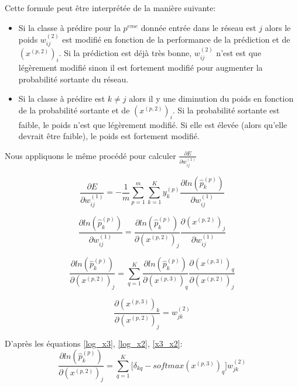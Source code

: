 \documentclass[a4paper,11pt,oneside,roman]{article}
\begin{document}
    Cette formule peut être interprétée de la manière suivante:
    \begin{itemize}
        \item Si la classe à prédire pour la $p^{eme}$ donnée entrée dans le réseau est $j$ alors le poids $w_{ij}^{(2)}$ est modifié en fonction de la performance de la prédiction et de $(x^{(p,2)})_{i}$.
        Si la prédiction est déjà très bonne, $w_{ij}^{(2)}$ n'est est que légèrement modifié sinon il est fortement modifié pour augmenter la probabilité sortante du réseau.
        \item Si la classe à prédire est $k \ne j$ alors il y une diminution du poids en fonction de la probabilité sortante et de $(x^{(p,2)})_{i}$. Si la probabilité sortante est faible, le poids n'est que légèrement modifié. Si elle est élevée (alors qu'elle devrait être faible), le poids est fortement modifié.
    \end{itemize}

    Nous appliquons le même procédé pour calculer $\frac{\partial E}{\partial w_{ij}^{(1)}}$

    \begin{equation}
        \frac{\partial E}{\partial w_{ij}^{(1)}} = -\frac{1}{m} \sum\limits_{p=1}^{m} \sum\limits_{k=1}^{K} y_k^{(p)} \frac{\partial ln(\hat{p}_{k}^{(p)})}{\partial w_{ij}^{(1)}}
        \label{E_wij1}
    \end{equation}

    \begin{equation}
        \frac{\partial ln(\hat{p}_{k}^{(p)})}{\partial w_{ij}^{(1)}} = \frac{\partial ln(\hat{p}_{k}^{(p)})}{\partial (x^{(p,2)})_j} \frac{\partial (x^{(p,2)})_j}{\partial w_{ij}^{(1)}}
        \label{log_wij}
    \end{equation}

    \begin{equation}
        \frac{\partial ln(\hat{p}_{k}^{(p)})}{\partial (x^{(p,2)})_j} = \sum\limits_{q=1}^{K} \frac{\partial ln(\hat{p}_{k}^{(p)})}{\partial (x^{(p,3)})_q} \frac{\partial (x^{(p,3)})_q}{\partial (x^{(p,2)})_j}
        \label{log_x2}
    \end{equation}
    
    \begin{equation}
        \frac{\partial (x^{(p,3)})_k}{\partial (x^{(p,2)})_j} = w_{jk}^{(2)}
        \label{x3_x2}
    \end{equation}
    
    D'après les équations \eqref{log_x3}, \eqref{log_x2}, \eqref{x3_x2}:
    \begin{equation}
        \frac{\partial ln(\hat{p}_{k}^{(p)})}{\partial (x^{(p,2)})_j} = \sum\limits_{q=1}^{K} \bigg[ \delta_{kq} - softmax(x^{(p,3)})_q \bigg] w_{jk}^{(2)}
        \label{log_x2_final}
    \end{equation}
    
\end{document}

